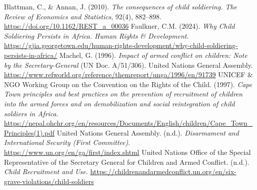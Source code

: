 
\begin{referencelist}
   Blattman, C., \& Annan, J. (2010). \emph{The consequences of child soldiering. The Review of Economics and Statistics}, 92(4), 882–898. \url{https://doi.org/10.1162/REST_a_00036}
   Faulkner, C.M. (2024). \emph{Why Child Soldiering Persists in Africa. Human Rights \& Development.} \url{https://gjia.georgetown.edu/human-rights-development/why-child-soldiering-persists-in-africa/}
   Machel, G. (1996). \emph{Impact of armed conflict on children: Note by the Secretary-General} (UN Doc. A/51/306). United Nations General Assembly. \url{https://www.refworld.org/reference/themreport/unga/1996/en/91739}
   UNICEF \& NGO Working Group on the Convention on the Rights of the Child. (1997). \emph{Cape Town principles and best practices on the prevention of recruitment of children into the armed forces and on demobilization and social reintegration of child soldiers in Africa.} \url{https://nepal.ohchr.org/en/resources/Documents/English/children/Cape_Town_Principles(1).pdf}
   United Nations General Assembly. (n.d.). \emph{Disarmament and International Security (First Committee)}. \url{https://www.un.org/en/ga/first/index.shtml}
   United Nations Office of the Special Representative of the Secretary General for Children and Armed Conflict. (n.d.). \emph{Child Recruitment and Use.} \url{https://childrenandarmedconflict.un.org/en/six-grave-violations/child-soldiers}
\end{referencelist}
